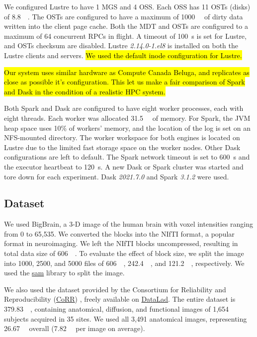 \documentclass[AMA,STIX1COL]{WileyNJD-v2}
\newcommand{\HL}[1]{\hl{#1}}
\begin{document}
We configured Lustre to have 1 MGS and 4 OSS.
Each OSS has 11 OSTs (disks) of \SI{8.8}{\tebi\byte}.
The OSTs are configured to have a maximum of \SI{1000}{\mebi\byte} of dirty data written into the client page cache.
Both the MDT and OSTs are configured to a maximum of 64 concurrent RPCs in flight.
A timeout of \SI{100}{\second} is set for Lustre, and OSTs checksum are disabled.
Lustre \textit{2.14.0-1.el8} is installed on both the Lustre clients and servers.
\HL{We used the default inode configuration for Lustre.}
		
\HL{Our system uses similar hardware as Compute Canada Beluga, and replicates as
	close as possible it's configuration.
	This let us make a fair comparison of Spark and Dask in the condition of a realistic
HPC system.}
			
Both Spark and Dask are configured to have eight worker processes, each with eight threads.
Each worker was allocated \SI{31.5}{\gibi\byte} of memory.
For Spark, the JVM heap space uses 10\% of workers' memory, and the location of the log is set on an NFS-mounted directory.
The worker workspace for both engines is located on Lustre due to the limited fast storage space on the worker nodes.
Other Dask configurations are left to default.
The Spark network timeout is set to \SI{600}{\second} and the executor heartbeat to \SI{120}{\second}.
A new Dask or Spark cluster was started and tore down for each experiment.
Dask \textit{2021.7.0} and Spark \textit{3.1.2} were used.
			
\subsection{Dataset}
We used BigBrain\cite{Amunts:13}, a 3-D image of the human brain with voxel
intensities ranging from 0 to 65,535. We converted the blocks into the
NIfTI format, a popular format in neuroimaging. We left the NIfTI blocks
uncompressed, resulting in total data size of \SI{606}{\gibi\byte}. To
evaluate the effect of block size, we split the image into 1000, 2500,
and 5000 files of \SI{606}{\mebi\byte}, \SI{242.4}{\mebi\byte}, and
\SI{121.2}{\mebi\byte}, respectively.
We used the \href{https://github.com/big-data-lab-team/sam}{sam} library to split the image.
				
We also used the dataset provided by the Consortium for Reliability and
Reproducibility
(\href{http://fcon_1000.projects.nitrc.org/indi/CoRR/html/}{CoRR})
\cite{zuo2014open}, freely available on
\href{https://datasets.datalad.org/?dir=/corr/RawDataBIDS}{DataLad}.
The entire dataset is \SI{379.83}{\gibi\byte}, containing anatomical, diffusion,
and functional images of 1,654 subjects acquired in 35 sites.
We used all 3,491 anatomical images, representing \SI{26.67}{\gibi\byte} overall
(\SI{7.82}{\mebi\byte} per image on average).
				
\end{document}
